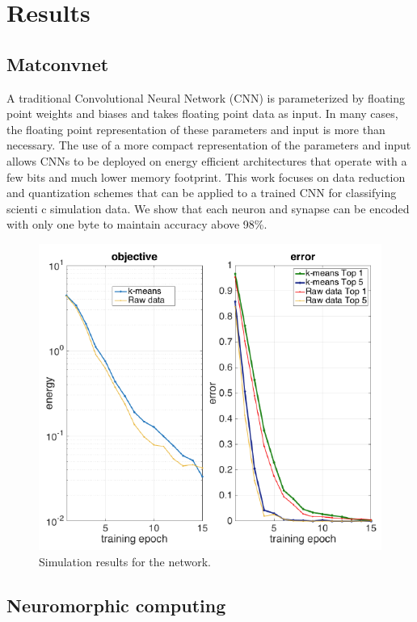 \documentclass[conference]{IEEEtran}
\begin{document}
\section{Results}

\subsection{Matconvnet}
A traditional Convolutional Neural Network (CNN) is parameterized by floating point weights and biases
and takes floating point data as input. In many cases, the floating point representation of these
parameters and input is more than necessary. The use of a more compact representation of the
parameters and input allows CNNs to be deployed on energy efficient architectures that operate with a
few bits and much lower memory footprint. This work focuses on data reduction and quantization schemes
that can be applied to a trained CNN for classifying scienti c simulation data. We show that each
neuron and synapse can be encoded with only one byte to maintain accuracy above 98\%.
\begin{figure}[h]
\centering
\includegraphics[width=\linewidth]{img/joao3.png}
\caption{Simulation results for the network.}
\label{fig_sim}
\end{figure}


\subsection{Neuromorphic computing}
\end{document}
